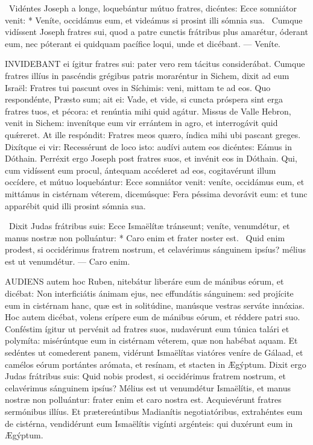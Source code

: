 \R\ Vidéntes Joseph a longe, loquebántur mútuo fratres, dicéntes: Ecce somniátor venit: * Veníte, occidámus eum, et videámus si prosint illi sómnia sua. \V\ Cumque vidíssent Joseph fratres sui, quod a patre cunctis frátribus plus amarétur, óderant eum, nec póterant ei quidquam pacífice loqui, unde et dicébant. --- Veníte.


\lettrine[lines=2]{I}{NVIDEBANT} ei ígitur fratres sui: pater vero rem tácitus considerábat. Cumque fratres illíus in pascéndis grégibus patris moraréntur in Sichem, dixit ad eum Israël: Fratres tui pascunt oves in Síchimis: veni, mittam te ad eos. Quo respondénte, Præsto sum; ait ei: Vade, et vide, si cuncta próspera sint erga fratres tuos, et pécora: et renúntia mihi quid agátur. Missus de Valle Hebron, venit in Sichem: invenítque eum vir errántem in agro, et interrogávit quid quǽreret. At ille respóndit: Fratres meos quæro, índica mihi ubi pascant greges. Dixítque ei vir: Recessérunt de loco isto: audívi autem eos dicéntes: Eámus in Dóthain. Perréxit ergo Joseph post fratres suos, et invénit eos in Dóthain. Qui, cum vidíssent eum procul, ántequam accéderet ad eos, cogitavérunt illum occídere, et mútuo loquebántur: Ecce somniátor venit: veníte, occidámus eum, et mittámus in cistérnam véterem, dicemúsque: Fera péssima devorávit eum: et tunc apparébit quid illi prosint sómnia sua.

\R\ Dixit Judas frátribus suis: Ecce Ismaëlítæ tránseunt; veníte, venumdétur, et manus nostræ non polluántur: * Caro enim et frater noster est. \V\ Quid enim prodest, si occidérimus fratrem nostrum, et celavérimus sánguinem ipsíus? mélius est ut venumdétur. --- Caro enim.


\lettrine[lines=2]{A}{UDIENS} autem hoc Ruben, nitebátur liberáre eum de mánibus eórum, et dicébat: Non interficiátis ánimam ejus, nec effundátis sánguinem: sed projícite eum in cistérnam hanc, quæ est in solitúdine, manúsque vestras serváte innóxias. Hoc autem dicébat, volens erípere eum de mánibus eórum, et réddere patri suo. Conféstim ígitur ut pervénit ad fratres suos, nudavérunt eum túnica talári et polymíta: misérúntque eum in cistérnam véterem, quæ non habébat aquam. Et sedéntes ut comederent panem, vidérunt Ismaëlítas viatóres veníre de Gálaad, et camélos eórum portántes arómata, et resínam, et stacten in Ægýptum. Dixit ergo Judas frátribus suis: Quid nobis prodest, si occidérimus fratrem nostrum, et celavérimus sánguinem ipsíus? Mélius est ut venumdétur Ismaëlítis, et manus nostræ non polluántur: frater enim et caro nostra est. Acquievérunt fratres sermónibus illíus. Et prætereúntibus Madianítis negotiatóribus, extrahéntes eum de cistérna, vendidérunt eum Ismaëlítis vigínti argénteis: qui duxérunt eum in Ægýptum.

